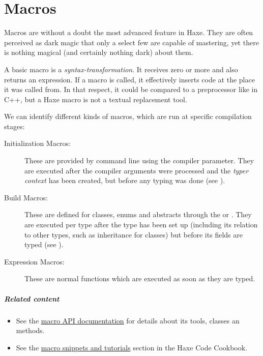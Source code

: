 \chapter{Macros}
\label{macro}

Macros are without a doubt the most advanced feature in Haxe. They are often perceived as dark magic that only a select few are capable of mastering, yet there is nothing magical (and certainly nothing dark) about them.




A basic macro is a \emph{syntax-transformation}. It receives zero or more  and also returns an expression. If a macro is called, it effectively inserts code at the place it was called from. In that respect, it could be compared to a preprocessor like  in C++, but a Haxe macro is not a textual replacement tool.

We can identify different kinds of macros, which are run at specific compilation stages:

\begin{description}
	\item[Initialization Macros:] These are provided by command line using the  compiler parameter. They are executed after the compiler arguments were processed and the \emph{typer context} has been created, but before any typing was done (see ).
	\item[Build Macros:] These are defined for classes, enums and abstracts through the  or  . They are executed per type after the type has been set up (including its relation to other types, such as inheritance for classes) but before its fields are typed (see ).
	\item[Expression Macros:] These are normal functions which are executed as soon as they are typed.
\end{description}
	
\paragraph{Related content}
\begin{itemize}
	\item See the \href{http://api.haxe.org/haxe/macro}{macro API documentation} for details about its tools, classes an methods. 
	\item See the \href{http://code.haxe.org/category/macros/}{macro snippets and tutorials} section in the Haxe Code Cookbook.
\end{itemize}

